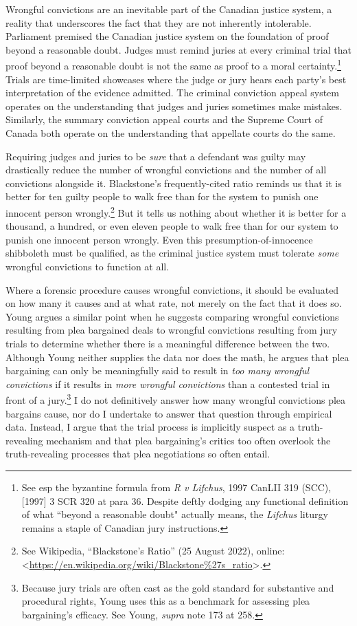 Wrongful convictions are an inevitable part of the Canadian justice system, a reality that underscores the fact that they are not inherently intolerable. Parliament premised the Canadian justice system on the foundation of proof beyond a reasonable doubt. Judges must remind juries at every criminal trial that proof beyond a reasonable doubt is not the same as proof to a moral certainty.\footnote{See esp the byzantine formula from \textit{R v Lifchus}, 1997 CanLII 319 (SCC), [1997] 3 SCR 320 at para 36. Despite deftly dodging any functional definition of what ``beyond a reasonable doubt" actually means, the \textit{Lifchus} liturgy remains a staple of Canadian jury instructions.} Trials are time-limited showcases where the judge or jury hears each party's best interpretation of the evidence admitted. The criminal conviction appeal system operates on the understanding that judges and juries sometimes make mistakes. Similarly, the summary conviction appeal courts and the Supreme Court of Canada both operate on the understanding that appellate courts do the same. 

Requiring judges and juries to be \textit{sure} that a defendant was guilty may drastically reduce the number of wrongful convictions and the number of all convictions alongside it. Blackstone's frequently-cited ratio reminds us that it is better for ten guilty people to walk free than for the system to punish one innocent person wrongly.\footnote{See Wikipedia, “Blackstone's Ratio” (25 August 2022), online:\textless \url{https://en.wikipedia.org/wiki/Blackstone\%27s_ratio}\textgreater.} But it tells us nothing about whether it is better for a thousand, a hundred, or even eleven people to walk free than for our system to punish one innocent person wrongly. Even this presumption-of-innocence shibboleth must be qualified, as the criminal justice system must tolerate \textit{some} wrongful convictions to function at all. 

Where a forensic procedure causes wrongful convictions, it should be evaluated on how many it causes and at what rate, not merely on the fact that it does so. Young argues a similar point when he suggests comparing wrongful convictions resulting from plea bargained deals to wrongful convictions resulting from jury trials to determine whether there is a meaningful difference between the two. Although Young neither supplies the data nor does the math, he argues that plea bargaining can only be meaningfully said to result in \textit{too many wrongful convictions} if it results in \textit{more wrongful convictions} than a contested trial in front of a jury.\footnote{Because jury trials are often cast as the gold standard for substantive and procedural rights, Young uses this as a benchmark for assessing plea bargaining's efficacy. See Young, \textit{supra} note 173 at 258.} I do not definitively answer how many wrongful convictions plea bargains cause, nor do I undertake to answer that question through empirical data. Instead, I argue that the trial process is implicitly suspect as a truth-revealing mechanism and that plea bargaining's critics too often overlook the truth-revealing processes that plea negotiations so often entail. 

